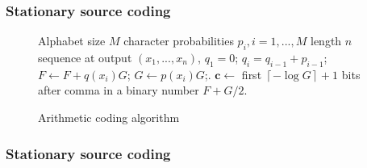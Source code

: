 \documentclass[14pt]{beamer}
\renewcommand{\vec}[1]{\ensuremath{\boldsymbol{#1}}}
\begin{document}
\begin{frame}
\frametitle{Stationary source coding}   

    \begin{center}
    \begin{figure}
    \scalebox{0.75} {
    \begin{algorithm}[H]
    \dontprintsemicolon
      \KwIn
      {
       Alphabet size $M$
       character probabilities $p_i, i=1,...,M$
       length  $n$
       sequence at output $(x_1,...,x_n)$,
       }
      \BlankLine
      $q_{1}=0$;
      {
      $q_i=q_{i-1}+p_{i-1}$;
      }
      \BlankLine
      {
      $ F \leftarrow F + q(x_i )G $;
      $ G \leftarrow p(x_i )G $;.
      }
      \BlankLine
      $\vec c\leftarrow $ first
      $\left\lceil { - \log G } \right\rceil +1$ bits after comma in a binary number $F+G/2$.
    \end{algorithm}
    }
    \caption{Arithmetic coding algorithm}
    \label{alg_arcod}
    \end{figure}
    \end{center}
\end{frame}


\begin{frame}
\frametitle{Stationary source coding}   

    \begin{table}[htbp]
    \caption{Arithmetic coding of sequence}
    \label{tablAC}
    \begin{minipage}{\linewidth}
    \begin{center}
    \end{center}
    \end{minipage}
    \end{table}
\end{frame}
\end{document}
